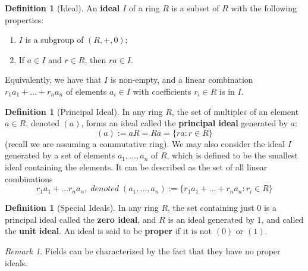 \documentclass[12pt]{article}
\theoremstyle{definition}
\newtheorem{defn}[thm]{Definition}
\theoremstyle{remark}
\newtheorem{rmk}[thm]{Remark}
\numberwithin{equation}{section}
\newcommand\B[1]{\textbf{ #1}}
\begin{document}
\vspace{15pt}


\begin{defn}[Ideal]
        An \B{ideal} $I$ of a ring $R$ is a subset of $R$ with the following properties: \begin{enumerate}
                \item $I$ is a subgroup of $(R,+,0)$;
                \item If $a \in I$ and $r \in R$, then $ra \in I$.
        \end{enumerate}
        Equivalently, we have that $I$ is non-empty, and a linear combination $r_1a_1+\hdots +r_na_n$ of elements $a_i \in I$ with coefficients $r_i \in R$ is in $I$.
\end{defn}


\vspace{15pt}

\begin{defn}[Principal Ideal]
        In any ring $R$, the set of multiples of an element $a \in R$, denoted $(a)$, forms an ideal called the \B{principal ideal} generated by $a$: \begin{equation}
                (a):= aR = Ra = \{ra:r\in R\}
        \end{equation}
        (recall we are assuming a commutative ring). We may also consider the ideal $I$ generated by a set of elements $a_1,...,a_n$ of $R$, which is defined to be the smallest ideal containing the elements. It can be described as the set of all linear combinations \begin{equation}
                r_1a_1+\hdots r_na_n,\;denoted\;(a_1,...,a_n):=\{r_1a_1+...+r_na_n:r_i\in R\}
        \end{equation}
\end{defn}

\vspace{15pt}

\begin{defn}[Special Ideals]
        In any ring $R$, the set containing just $0$ is a principal ideal called the \B{zero ideal}, and $R$ is an ideal generated by $1$, and called the \B{unit ideal}. An ideal is said to be \B{proper} if it is not $(0)$ or $(1)$.
\end{defn}

\vspace{15pt}

\begin{rmk}
        Fields can be characterized by the fact that they have no proper ideals.
\end{rmk}
\end{document}
